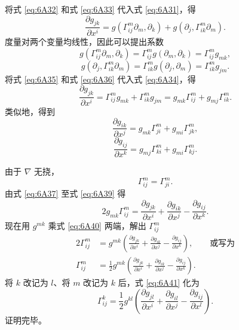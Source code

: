 将式 \eqref{eq:6A32} 和式 \eqref{eq:6A33} 代入式 \eqref{eq:6A31}，得
\begin{equation*}
  \frac{\partial g_{jk}}{\partial x^i}
   =g(\Gamma^m_{ij}\partial_m,\partial_k)+g(\partial_j,\Gamma^m_{ik}\partial_m).
  \tag{6A34}\label{eq:6A34}
\end{equation*}
度量对两个变量均线性，因此可以提出系数
\begin{equation*}
  g(\Gamma^m_{ij}\partial_m,\partial_k)
   =\Gamma^m_{ij}g(\partial_m,\partial_k)=\Gamma^m_{ij}g_{mk},
  \tag{6A35}\label{eq:6A35}
\end{equation*}
\begin{equation*}
  g(\partial_j,\Gamma^m_{ik}\partial_m)
   =\Gamma^m_{ik}g(\partial_j,\partial_m)=\Gamma^m_{ik}g_{jm}.
  \tag{6A36}\label{eq:6A36}
\end{equation*}
将式 \eqref{eq:6A35} 和式 \eqref{eq:6A36} 代入式 \eqref{eq:6A34}，得
\begin{equation*}
  \frac{\partial g_{jk}}{\partial x^i}
   =\Gamma^m_{ij}g_{mk}+\Gamma^m_{ik}g_{jm}
   =g_{mk}\Gamma^m_{ij}+g_{mj}\Gamma^m_{ik}.
  \tag{6A37}\label{eq:6A37}
\end{equation*}
类似地，得到
\begin{equation*}
  \frac{\partial g_{ik}}{\partial x^j}=g_{mk}\Gamma^m_{ji}+g_{mi}\Gamma^m_{jk},
  \tag{6A38}\label{eq:6A38}
\end{equation*}
\begin{equation*}
  \frac{\partial g_{ij}}{\partial x^k}=g_{mj}\Gamma^m_{ki}+g_{mi}\Gamma^m_{kj}.
  \tag{6A39}\label{eq:6A39}
\end{equation*}

由于 $\nabla$ 无挠，
\[
  \Gamma^m_{ij}=\Gamma^m_{ji}.
\]
由式 \eqref{eq:6A37} 至式 \eqref{eq:6A39} 得
\begin{equation*}
  2g_{mk}\Gamma^m_{ij}
   =\frac{\partial g_{jk}}{\partial x^i}+\frac{\partial g_{ik}}{\partial x^j}
    -\frac{\partial g_{ij}}{\partial x^k}.
  \tag{6A40}\label{eq:6A40}
\end{equation*}
现在用 $g^{mk}$ 乘式 \eqref{eq:6A40} 两端，解出 $\Gamma^m_{ij}$%
%
\begin{equation*}
\begin{aligned}
  2\Gamma^m_{ij}
    &=g^{mk}\left(\frac{\partial g_{jk}}{\partial x^i}
       +\frac{\partial g_{ik}}{\partial x^j}-\frac{\partial g_{ij}}{\partial x^k}\right),
       \qquad\text{或写为}\\
  \Gamma^m_{ij}
    &=\frac12 g^{mk}\left(\frac{\partial g_{jk}}{\partial x^i}
       +\frac{\partial g_{ik}}{\partial x^j}-\frac{\partial g_{ij}}{\partial x^k}\right).
\end{aligned}
\tag{6A41}\label{eq:6A41}
\end{equation*}
将 $k$ 改记为 $l$、将 $m$ 改记为 $k$ 后，式 \eqref{eq:6A41} 化为
\begin{equation*}
  \Gamma^k_{ij}=\frac12 g^{kl}
     \left(\frac{\partial g_{jl}}{\partial x^i}
          +\frac{\partial g_{il}}{\partial x^j}-\frac{\partial g_{ij}}{\partial x^l}\right).
  \tag{6A42}\label{eq:6A42}
\end{equation*}
证明完毕。

